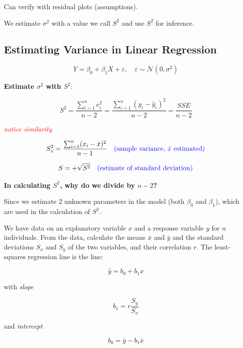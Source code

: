Can verify with residual plots (assumptions).

We estimate $\sigma^2$ with a value we call $S^2$ and use $S^2$ for inference.

\subsection*{Estimating Variance in Linear Regression}

\[
Y = \beta_0 + \beta_1 X + \varepsilon, \quad \varepsilon \sim \mathcal{N}(0, \sigma^2)
\]

\textbf{Estimate $\sigma^2$ with $S^2$}:

\[
S^2 = \frac{\sum_{i=1}^n e_i^2}{n - 2}
= \frac{\sum_{i=1}^n (y_i - \hat{y}_i)^2}{n - 2}
= \frac{SSE}{n - 2}
\]

\hfill \textcolor{red}{\textit{notice similarity}}

\[
S_x^2 = \frac{\sum_{i=1}^n (x_i - \bar{x})^2}{n - 1}
\quad \textcolor{blue}{\text{(sample variance, }\bar{x} \text{ estimated)}}
\]

\[
S = +\sqrt{S^2}
\quad \textcolor{blue}{\text{(estimate of standard deviation)}} \\
\]

\vspace{1em}

\textbf{In calculating $S^2$, why do we divide by $n-2$?}

Since we estimate 2 unknown parameters in the model (both $\beta_0$ and $\beta_1$), which are used in the calculation of $S^2$.

\begin{tcolorbox}[colback=yellow!5, colframe=yellow!50!black,
title={Equation of the Least-Squares Regression Line}, 
boxrule=0.5pt, sharp corners, breakable]

We have data on an explanatory variable $x$ and a response variable $y$ for $n$ individuals. From the data, calculate the means $\bar{x}$ and $\bar{y}$ and the standard deviations $S_x$ and $S_y$ of the two variables, and their correlation $r$. The least-squares regression line is the line:

\[
\hat{y} = b_0 + b_1 x
\]

with \textit{slope}

\[
b_1 = r \frac{S_y}{S_x}
\]

and \textit{intercept}

\[
b_0 = \bar{y} - b_1 \bar{x}
\]

\end{tcolorbox}

